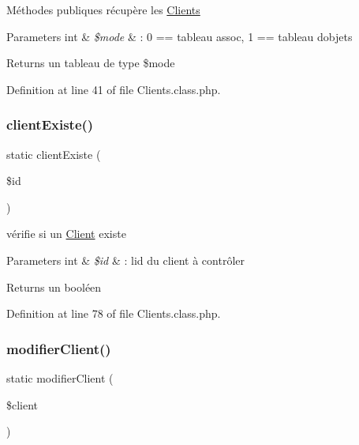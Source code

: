 Méthodes publiques récupère les \hyperlink{class_clients}{Clients} 
\begin{DoxyParams}[1]{Parameters}
int & {\em \$mode} & \+: 0 == tableau assoc, 1 == tableau d\textquotesingle{}objets \\
\hline
\end{DoxyParams}
\begin{DoxyReturn}{Returns}
un tableau de type \$mode 
\end{DoxyReturn}


Definition at line 41 of file Clients.\+class.\+php.

\mbox{\label{class_clients_ac60a199f04ffa45e77b9b5a8d71f3cd5}} 
\subsubsection{\texorpdfstring{client\+Existe()}{clientExiste()}}
{\footnotesize\ttfamily static client\+Existe (\begin{DoxyParamCaption}\item[{}]{\$id }\end{DoxyParamCaption})\hspace{0.3cm}{\ttfamily [static]}}

vérifie si un \hyperlink{class_client}{Client} existe 
\begin{DoxyParams}[1]{Parameters}
int & {\em \$id} & \+: l\textquotesingle{}id du client à contrôler \\
\hline
\end{DoxyParams}
\begin{DoxyReturn}{Returns}
un booléen 
\end{DoxyReturn}


Definition at line 78 of file Clients.\+class.\+php.

\mbox{\label{class_clients_a17b60c983ed7423a2b4fb6d1bf6ee5d8}} 
\subsubsection{\texorpdfstring{modifier\+Client()}{modifierClient()}}
{\footnotesize\ttfamily static modifier\+Client (\begin{DoxyParamCaption}\item[{}]{\$client }\end{DoxyParamCaption})\hspace{0.3cm}{\ttfamily [static]}}

